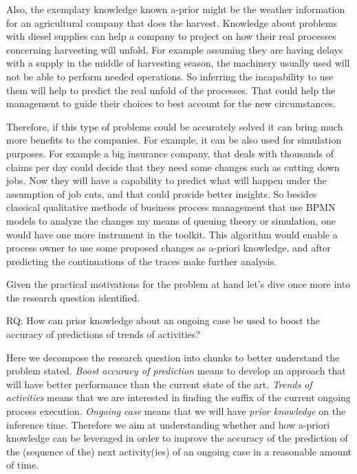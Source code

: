 Also, the exemplary knowledge known a-prior might be the weather information for an agricultural company that does the harvest. Knowledge about problems with diesel supplies can help a company to project on how their real processes concerning harvesting will unfold. For example assuming they are having delays with a supply in the middle of harvesting season, the machinery usually used will not be able to perform needed operations. So inferring the incapability to use them will help to predict the real unfold of the processes. That could help the management to guide their choices to best account for the new circumstances. 


Therefore, if this type of problems could be accurately solved it can bring much more benefits to the companies. For example, it can be also used for simulation purposes. For example a big insurance company, that deals with thousands of claims per day could decide that they need some changes such as cutting down jobs. Now they will have a capability to predict what will happen under the assumption of job cuts, and that could provide better insights. So besides classical qualitative methods of business process management that use BPMN models to analyze the changes my means of queuing theory or simulation, one would have one more instrument in the toolkit. This algorithm would enable a process owner to use some proposed changes as a-priori knowledge, and after predicting the continuations of the traces make further analysis. 

Given the practical motivations for the problem at hand let's dive once more into the research question identified.

RQ: How can prior knowledge about an ongoing case be used to boost the accuracy of predictions of trends of activities?

Here we decompose the research question into chunks to better understand the problem stated. \textit{Boost accuracy of prediction} means to develop an approach that will have better performance than the current state of the art. \textit{Trends of activities} means that we are interested in finding the suffix of the current ongoing process execution. \textit{Ongoing case} means that we will have \textit{prior knowledge} on the inference time. Therefore we aim at understanding whether and how a-priori knowledge can be leveraged in order to improve the accuracy of the prediction of the (sequence of the) next activity(ies) of an ongoing case in a reasonable amount of time.


